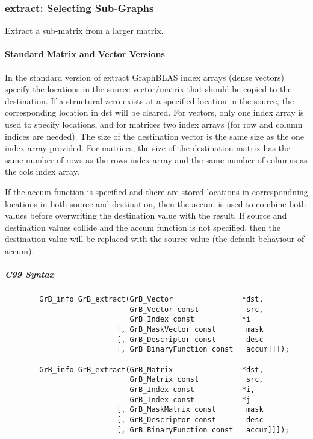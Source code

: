 \subsubsection{{\sf extract}: Selecting Sub-Graphs}

Extract a sub-matrix from a larger matrix. 

\paragraph{Standard Matrix and Vector Versions}

In the standard version of {\sf extract} GraphBLAS index arrays (dense vectors)
specify the locations in the source vector/matrix that should be copied to the
destination.  If a structural zero exists at a specified location in the source,
the corresponding location in dst will be cleared.  For vectors, only one index array is used to specify
locations, and for matrices two index arrays (for row and column indices are needed).
The size of the destination vector is the same size as the one index array provided.
For matrices, the size of the destination matrix has the same number of rows as the
{\sf rows} index array and the same number of columns as the {\sf cols} index array.

If the {\sf accum} function is specified and there are stored locations in correspondning
locations in both source and destination, then the
{\sf accum} is used to combine both values before overwriting the destination value
with the result.  If source and destination values collide and the {\sf accum} function is
not specified, then the destination value will be replaced with the source value (the
default behaviour of {\sf accum}).

\subparagraph{C99 Syntax}

\begin{verbatim}
        GrB_info GrB_extract(GrB_Vector                *dst,
                             GrB_Vector const           src,
                             GrB_Index const           *i
                          [, GrB_MaskVector const       mask
                          [, GrB_Descriptor const       desc
                          [, GrB_BinaryFunction const   accum]]]);
                  
        GrB_info GrB_extract(GrB_Matrix                *dst,
                             GrB_Matrix const           src,
                             GrB_Index const           *i,
                             GrB_Index const           *j
                          [, GrB_MaskMatrix const       mask
                          [, GrB_Descriptor const       desc
                          [, GrB_BinaryFunction const   accum]]]);
\end{verbatim}

